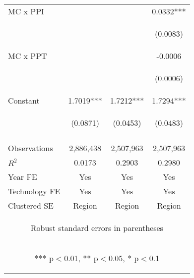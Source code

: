 \begin{center}
\begin{tabular}{lccc}
MC x PPI &  &  & 0.0332*** \\
\vspace{4pt} & \begin{footnotesize}\end{footnotesize} & \begin{footnotesize}\end{footnotesize} & \begin{footnotesize}(0.0083)\end{footnotesize} \\
MC x PPT &  &  & -0.0006 \\
\vspace{4pt} & \begin{footnotesize}\end{footnotesize} & \begin{footnotesize}\end{footnotesize} & \begin{footnotesize}(0.0006)\end{footnotesize} \\
Constant & 1.7019*** & 1.7212*** & 1.7294*** \\
 & \begin{footnotesize}(0.0871)\end{footnotesize} & \begin{footnotesize}(0.0453)\end{footnotesize} & \begin{footnotesize}(0.0483)\end{footnotesize} \\
\vspace{4pt} & \begin{footnotesize}\end{footnotesize} & \begin{footnotesize}\end{footnotesize} & \begin{footnotesize}\end{footnotesize} \\
Observations & 2,886,438 & 2,507,963 & 2,507,963 \\
$R^2$ & 0.0173 & 0.2903 & 0.2980 \\
Year FE & Yes & Yes & Yes \\
Technology FE & Yes & Yes & Yes \\
 Clustered SE & Region & Region & Region \\ \hline
\multicolumn{4}{c}{\begin{footnotesize} Robust standard errors in parentheses\end{footnotesize}} \\
\multicolumn{4}{c}{\begin{footnotesize} *** p$<$0.01, ** p$<$0.05, * p$<$0.1\end{footnotesize}} \\
\end{tabular}
\end{center}
